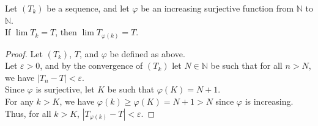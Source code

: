\documentclass{article}
\newenvironment{lemma}[1]{\renewcommand\theinnercustomlem{#1}\innercustomlem}
  {\endinnercustomlem}
\begin{document}
\begin{lemma}{(Fun Lemma)}
    Let $(T_k)$ be a sequence, and let $\varphi$ be an increasing surjective function from $\mathbb N$ to $\mathbb N$. \\
    If $\lim T_k = T$, then $\lim T_{\varphi(k)} = T$.
\end{lemma}
\begin{proof}
    Let $(T_k)$, $T$, and $\varphi$ be defined as above. \\
    Let $\varepsilon > 0$, and by the convergence of $(T_k)$ let $N \in \mathbb N$ be such that for all $n > N$, we have $|T_n - T| < \varepsilon$. \\
    Since $\varphi$ is surjective, let $K$ be such that $\varphi(K)=N+1$. \\
    For any $k > K$, we have $\varphi(k) \ge \varphi(K)=N+1>N$ since $\varphi$ is increasing. \\
    Thus, for all $k > K$, $|T_{\varphi(k)} - T| < \varepsilon$.
\end{proof}
\end{document}
